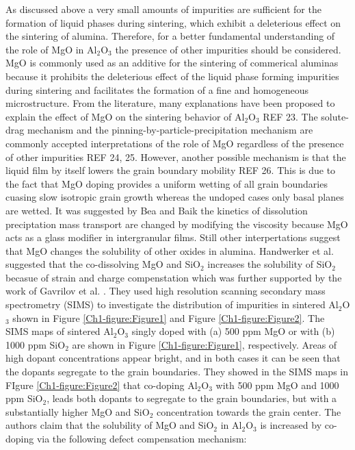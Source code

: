 As discussed above a very small amounts of impurities are sufficient for the formation of liquid phases during sintering, which exhibit a deleterious effect on the sintering of alumina. Therefore, for a better fundamental understanding of the role of MgO in Al$_{2}$O$_{3}$ the presence of other impurities should be considered. MgO is commonly used as an additive for the sintering of commerical aluminas because it prohibits the deleterious effect of the liquid phase forming impurities during sintering and facilitates the formation of a fine and homogeneous microstructure. From the literature, many explanations have been proposed to explain the effect of MgO on the sintering behavior of Al$_{2}$O$_{3}$ \cite{Compson2013} REF 23. The solute-drag mechanism and the pinning-by-particle-precipitation mechanism are commonly accepted interpretations of the role of MgO regardless of the presence of other impurities REF 24, 25. However, another possible mechanism is that the liquid film by itself lowers the grain boundary mobility REF 26. This is due to the fact that MgO doping provides a uniform wetting of all grain boundaries cuasing slow isotropic grain growth whereas the undoped cases only basal planes are wetted. It was suggested by Bea and Baik \cite{Bae1994} the kinetics of dissolution preciptation mass transport are changed by modifying the viscosity because MgO acts as a glass modifier in intergranular films. Still other interpertations suggest that MgO changes the solubility of other oxides in alumina. Handwerker et al. \cite{Handwerker1989} suggested that the co-dissolving MgO and SiO$_{2}$ increases the solubility of SiO$_{2}$ becasue of strain and charge compenstation which was further supported by the work of Gavrilov et al. \cite{Gavrilov1999}. They used high resolution scanning secondary mass spectrometry (SIMS) to investigate the distribution of impurities in sintered Al$_{2}$O$_{3}$ shown in Figure \ref{Ch1-figure:Figure1} and Figure \ref{Ch1-figure:Figure2}. The SIMS maps of sintered Al$_{2}$O$_{3}$ singly doped with (a) 500 ppm MgO or with (b) 1000 ppm SiO$_{2}$ are shown in Figure \ref{Ch1-figure:Figure1}, respectively. Areas of high dopant concentrations appear bright, and in both cases it can be seen that the dopants segregate to the grain boundaries. They showed in the SIMS maps in FIgure \ref{Ch1-figure:Figure2} that co-doping Al$_{2}$O$_{3}$ with 500 ppm MgO and 1000 ppm SiO$_{2}$, leads both dopants to segregate to the grain boundaries, but with a substantially higher MgO and SiO$_{2}$ concentration towards the grain center. The authors claim that the solubility of MgO and SiO$_{2}$ in Al$_{2}$O$_{3}$ is increased by co-doping via the following defect compensation mechanism:

